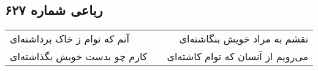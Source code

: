 \begin{center}
\section*{رباعی شماره ۶۲۷}
\label{sec:sh627}
\begin{longtable}{l p{0.5cm} r}
آنم که توام ز خاک برداشته‌ای
&&
نقشم به مراد خویش بنگاشته‌ای
\\
کارم چو بدست خویش بگذاشته‌ای
&&
می‌رویم از آنسان که توام کاشته‌ای
\\
\end{longtable}
\end{center}
